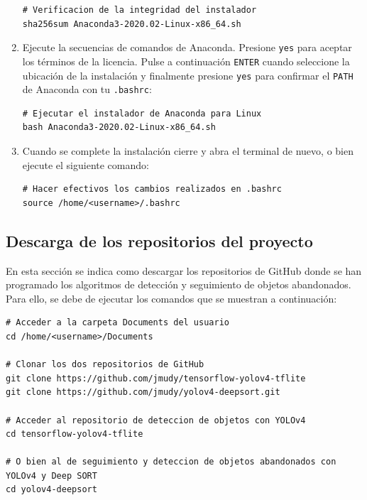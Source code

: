 \begin{enumerate}
\begin{lstlisting}[language=iPython,caption=Verificación de la integridad de la instalación de Anaconda,captionpos=b,label={lst:verificar-sha256}]
# Verificacion de la integridad del instalador
sha256sum Anaconda3-2020.02-Linux-x86_64.sh
\end{lstlisting}
    
    \item Ejecute la secuencias de comandos de Anaconda. Presione \texttt{yes} para aceptar los términos de la licencia. Pulse a continuación \texttt{ENTER} cuando seleccione la ubicación de la instalación y finalmente presione \texttt{yes} para confirmar el \texttt{PATH} de Anaconda con tu \texttt{.bashrc}:
    
    \vspace{0.5cm}
    
\begin{lstlisting}[language=iPython,caption=Ejecutar el instalador de Anaconda para Linux,captionpos=b,label={lst:install-conda}]
# Ejecutar el instalador de Anaconda para Linux
bash Anaconda3-2020.02-Linux-x86_64.sh
\end{lstlisting}
    
    \item Cuando se complete la instalación cierre y abra el terminal de nuevo, o bien ejecute el siguiente comando:
    
    \vspace{0.5cm}
    
\begin{lstlisting}[language=iPython,caption=Hacer efectivo los cambios en el fichero .bashrc,captionpos=b,label={lst:source-bashrc}]
# Hacer efectivos los cambios realizados en .bashrc
source /home/<username>/.bashrc
\end{lstlisting}
\end{enumerate}

\subsection{Descarga de los repositorios del proyecto}
\label{subsec:descargas-repos}

En esta sección se indica como descargar los repositorios de GitHub donde se han programado los algoritmos de detección y seguimiento de objetos abandonados. Para ello, se debe de ejecutar los comandos que se muestran a continuación:

\vspace{0.5cm}

\begin{lstlisting}[language=iPython,caption=Descarga repositorio,captionpos=b,label={lst:descarga-repo}]
# Acceder a la carpeta Documents del usuario
cd /home/<username>/Documents

# Clonar los dos repositorios de GitHub
git clone https://github.com/jmudy/tensorflow-yolov4-tflite
git clone https://github.com/jmudy/yolov4-deepsort.git

# Acceder al repositorio de deteccion de objetos con YOLOv4
cd tensorflow-yolov4-tflite

# O bien al de seguimiento y deteccion de objetos abandonados con YOLOv4 y Deep SORT
cd yolov4-deepsort
\end{lstlisting}

